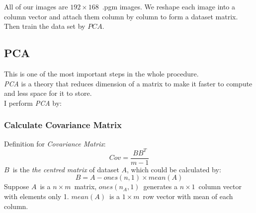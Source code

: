 All of our images are \(192\times168\)\ .pgm images. We reshape each image into a column vector and attach them column by column to form a dataset matrix. Then train the data set by \(PCA\).

\subsection{PCA}
This is one of the most important steps in the whole procedure.
\\
\emph{PCA} is a theory that reduces dimension of a matrix to make it faster to compute and less space for it to store.
\\
I perform \emph{PCA} by:

\subsubsection{Calculate Covariance Matrix}
Definition for \emph{Covariance Matrix}:
\begin{displaymath}
	Cov = \frac{BB^{T}}{m-1}
\end{displaymath}
\(B\)\ is the \emph{the centred matrix} of dataset \(A\), which could be calculated by:
\begin{displaymath}
	B = A - ones(n,1)\times mean(A)
\end{displaymath}
Suppose \(A\)\ is a \(n\times m\)\ matrix, \(ones(n_A,1)\)\ generates a \(n\times1\)\ column vector with elements only 1. \(mean(A)\)\ is a \(1\times m\)\ row vector with mean of each column.

